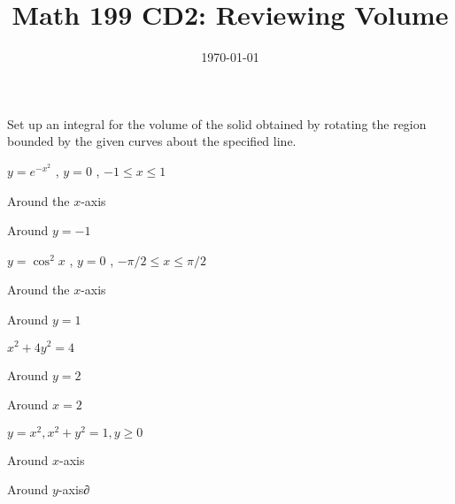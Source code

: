 
\usepackage{fullpage,amsmath,amssymb,amsthm}

\newcommand{\D}{\displaystyle}

\title{Math 199 CD2: Reviewing Volume}
\date{\today}




\maketitle
\be
	\item Set up an integral for the volume of the solid obtained by rotating the region bounded by the given curves about the specified line.
	\be
		\item $y=e^{-x^2}$ , $y = 0$ , $-1\leq x \leq 1$ 
		\be
			\item Around the $x$-axis
			\vskip 3cm
			\item Around $y=-1$
			\vskip 3cm 
		\ee

		\item $y=\cos^2x$ , $y = 0$ , $	-\pi/2 \leq x \leq \pi/2$ 
		\be
			\item Around the $x$-axis
			\vskip 3cm
			\item Around $y=1$
			\vskip 3cm 
		\ee

		\item $x^2+4y^2=4$  
		\be
			\item Around $y=2$
			\vskip 3cm
			\item Around $x=2$
			\vskip 3cm 
		\ee

		\item $y=x^2, x^2+y^2=1, y\geq 0$  
		\be
			\item Around $x$-axis
			\vskip 3cm
			\item Around $y$-axis∂
			\vskip 3cm 
		\ee
	\ee 
\ee

